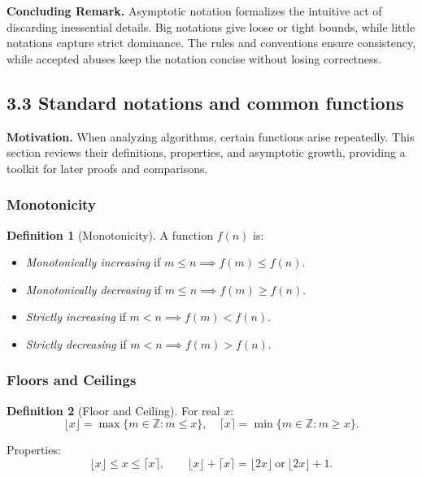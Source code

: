 \documentclass[12pt]{article}
\theoremstyle{definition}
\newtheorem{definition}{Definition}
\begin{document}
\noindent
\textbf{Concluding Remark.}  
Asymptotic notation formalizes the intuitive act of discarding inessential details. Big notations give loose or tight bounds, while little notations capture strict dominance. The rules and conventions ensure consistency, while accepted abuses keep the notation concise without losing correctness.  

\newpage

\subsection*{3.3 Standard notations and common functions \vspace{1em}\\}

\noindent
\textbf{Motivation.}  
When analyzing algorithms, certain functions arise repeatedly. This section reviews their definitions, properties, and asymptotic growth, providing a toolkit for later proofs and comparisons.

\subsubsection*{Monotonicity}
\begin{definition}[Monotonicity]
A function $f(n)$ is:
\begin{itemize}
    \item \emph{Monotonically increasing} if $m \leq n \implies f(m) \leq f(n)$.  
    \item \emph{Monotonically decreasing} if $m \leq n \implies f(m) \geq f(n)$.  
    \item \emph{Strictly increasing} if $m < n \implies f(m) < f(n)$.  
    \item \emph{Strictly decreasing} if $m < n \implies f(m) > f(n)$.  
\end{itemize}
\end{definition}

\subsubsection*{Floors and Ceilings}
\begin{definition}[Floor and Ceiling]
For real $x$:  
\[
\lfloor x \rfloor = \max \{ m \in \mathbb{Z} : m \leq x \}, \quad
\lceil x \rceil = \min \{ m \in \mathbb{Z} : m \geq x \}.
\]
\end{definition}
Properties:  
\[
\lfloor x \rfloor \leq x \leq \lceil x \rceil, \qquad
\lfloor x \rfloor + \lceil x \rceil = \lfloor 2x \rfloor \ \text{or} \ \lfloor 2x \rfloor + 1.
\]
\end{document}
